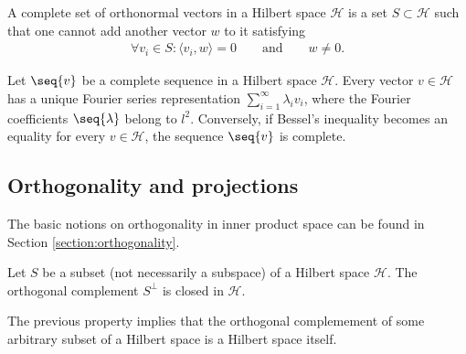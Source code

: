     \begin{adefinition}
        A complete set of orthonormal vectors in a Hilbert space $\mathcal{H}$ is a set $S\subset\mathcal{H}$ such that one cannot add another vector $w$ to it satisfying
        \begin{gather}
            \forall v_i\in S:\langle v_i,w \rangle = 0\qquad\text{and}\qquad w\neq0.
        \end{gather}
    \end{adefinition}

    \begin{theorem}[Parceval]
        Let $\seq{v}$ be a complete sequence in a Hilbert space $\mathcal{H}$. Every vector $v\in\mathcal{H}$ has a unique Fourier series representation $\sum_{i=1}^\infty\lambda_iv_i$, where the Fourier coefficients $\seq{\lambda}$ belong to $l^2$. Conversely, if Bessel's inequality becomes an equality for every $v\in\mathcal{H}$, the sequence $\seq{v}$ is complete.
    \end{theorem}

\subsection{Orthogonality and projections}

    The basic notions on orthogonality in inner product space can be found in Section \ref{section:orthogonality}.

    \begin{property}
        Let $S$ be a subset (not necessarily a subspace) of a Hilbert space $\mathcal{H}$. The orthogonal complement $S^\perp$ is closed in $\mathcal{H}$.
    \end{property}
    \begin{result}
        The previous property implies that the orthogonal complemement of some arbitrary subset of a Hilbert space is a Hilbert space itself.
    \end{result}

